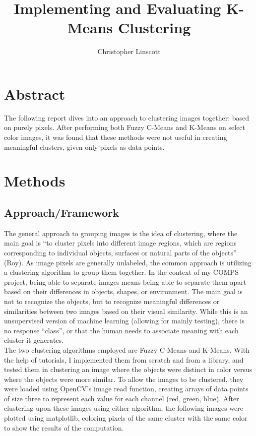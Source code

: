\documentclass[10pt,twocolumn]{article}
\title{Implementing and Evaluating K-Means Clustering}
\author{Christopher Linscott}
\affiliation{Occidental College}
\begin{document}
\maketitle


\section {Abstract}
\indent
The following report dives into an approach to clustering images together: based on purely pixels. After performing both Fuzzy C-Means and K-Means on select color images, it was found that these methods were not useful in creating meaningful clusters, given only pixels as data points.

\section {Methods}

\subsection {Approach/Framework}

\indent The general approach to grouping images is the idea of clustering, where the main goal is “to cluster pixels into different image regions, which are regions corresponding to individual objects, surfaces or natural parts of the objects” (Roy). As image pixels are generally unlabeled, the common approach is utilizing a clustering algorithm to group them together. In the context of my COMPS project, being able to separate images means being able to separate them apart based on their differences in objects, shapes, or environment. The main goal is not to recognize the objects, but to recognize meaningful differences or similarities between two images based on their visual similarity. While this is an unsupervised version of machine learning (allowing for mainly testing), there is no response “class”, or that the human needs to associate meaning with each cluster it generates.
\\
\indent The two clustering algorithms employed are Fuzzy C-Means and K-Means. With the help of tutorials, I implemented them from scratch and from a library, and tested them in clustering an image where the objects were distinct in color versus where the objects were more similar. To allow the images to be clustered, they were loaded using OpenCV’s image read function, creating arrays of data points of size three to represent each value for each channel (red, green, blue). After clustering upon these images using either algorithm, the following images were plotted using matplotlib, coloring pixels of the same cluster with the same color to show the results of the computation. 
\end{document}
